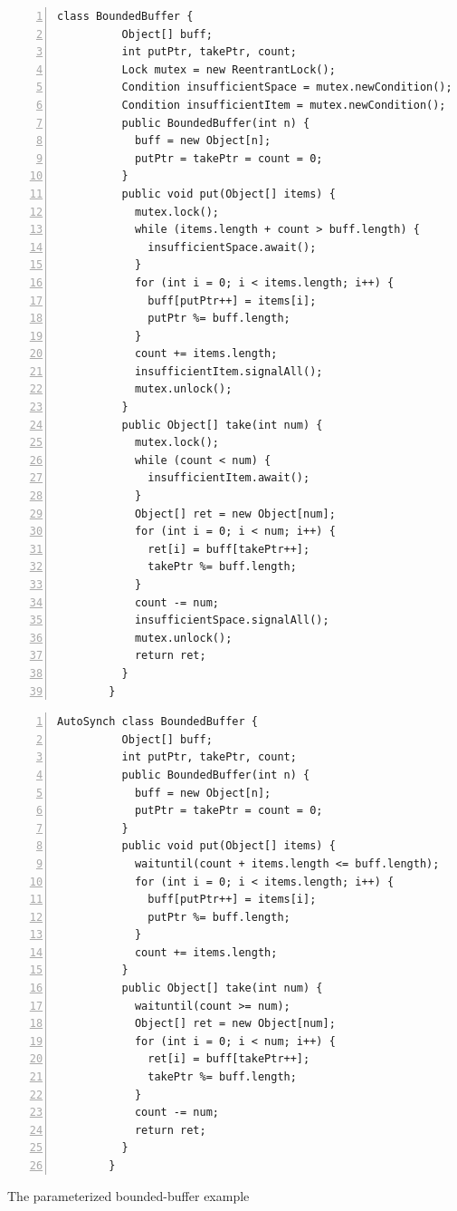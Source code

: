 \documentclass{sigplanconf}
\begin{document}
\begin{figure}[ht!]
\begin{multicols}{2}
    \begin{Verbatim}[fontsize=\footnotesize,gobble=8,frame=topline,
            framesep=5mm,numbers=left,numbersep=2pt,
            label=\fbox{\small\emph{Explicit-Signal}}]
        class BoundedBuffer {
          Object[] buff;  
          int putPtr, takePtr, count;
          Lock mutex = new ReentrantLock();
          Condition insufficientSpace = mutex.newCondition();
          Condition insufficientItem = mutex.newCondition();
          public BoundedBuffer(int n) {
            buff = new Object[n];
            putPtr = takePtr = count = 0;
          }
          public void put(Object[] items) {
            mutex.lock();
            while (items.length + count > buff.length) {
              insufficientSpace.await();
            }
            for (int i = 0; i < items.length; i++) {
              buff[putPtr++] = items[i];
              putPtr %= buff.length;
            }
            count += items.length;
            insufficientItem.signalAll();
            mutex.unlock();
          }
          public Object[] take(int num) {
            mutex.lock();
            while (count < num) {
              insufficientItem.await();
            }
            Object[] ret = new Object[num];
            for (int i = 0; i < num; i++) {
              ret[i] = buff[takePtr++];
              takePtr %= buff.length;
            }
            count -= num;
            insufficientSpace.signalAll();
            mutex.unlock();
            return ret;
          }
        }
    \end{Verbatim} 
    \begin{Verbatim}[fontsize=\footnotesize,gobble=8,frame=lines,framesep=5mm,
            numbers=left,numbersep=2pt,
            label=\fbox{\small\emph{Automatic-Signal}}]
        AutoSynch class BoundedBuffer { 
          Object[] buff; 
          int putPtr, takePtr, count; 
          public BoundedBuffer(int n) {
            buff = new Object[n];
            putPtr = takePtr = count = 0;
          }
          public void put(Object[] items) { 
            waituntil(count + items.length <= buff.length); 
            for (int i = 0; i < items.length; i++) {
              buff[putPtr++] = items[i];
              putPtr %= buff.length;
            }
            count += items.length; 
          } 
          public Object[] take(int num) { 
            waituntil(count >= num);
            Object[] ret = new Object[num];
            for (int i = 0; i < num; i++) {
              ret[i] = buff[takePtr++]; 
              takePtr %= buff.length; 
            }
            count -= num;
            return ret;
          }
        }
    \end{Verbatim}
\end{multicols}
    \caption{The parameterized bounded-buffer example}
    \label{fig:bb_exp}
\end{figure}
\end{document}
